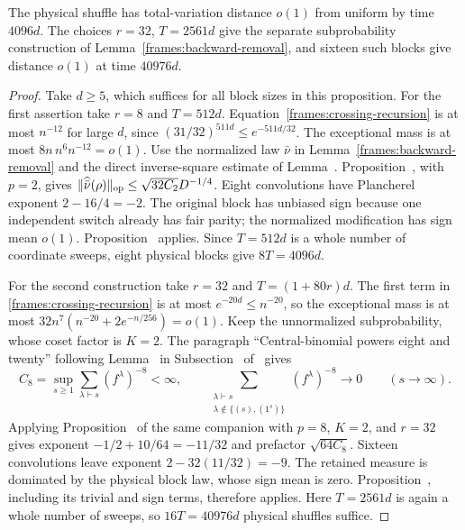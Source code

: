\begin{proposition}
\label{frames:pointwise-applications}
The physical shuffle has total-variation distance $o(1)$ from uniform
by time $4096d$. The choices $r=32$, $T=2561d$ give the separate
subprobability construction of Lemma~\ref{frames:backward-removal}, and
sixteen such blocks give distance $o(1)$ at time $40976d$.
\end{proposition}

\begin{proof}
Take $d\ge5$, which suffices for all block sizes in this proposition.
For the first assertion take $r=8$ and $T=512d$.
Equation~\eqref{frames:crossing-recursion} is at most $n^{-12}$ for
large $d$, since $(31/32)^{511d}\le e^{-511d/32}$.
The exceptional mass is at most $8n\,n^6n^{-12}=o(1)$.
Use the normalized law $\bar\nu$ in Lemma~\ref{frames:backward-removal} and the
direct inverse-square estimate of Lemma~.
Proposition~, with $p=2$, gives
$\|\widehat{\bar\nu}(\rho)\|_{\rm op}\le\sqrt{32C_2}D^{-1/4}$.
Eight convolutions have Plancherel exponent $2-16/4=-2$.
The original block has unbiased sign because one independent switch
already has fair parity; the normalized modification has sign mean
$o(1)$. Proposition~ applies. Since $T=512d$
is a whole number of coordinate sweeps, eight physical blocks give
$8T=4096d$.

For the second construction take $r=32$ and $T=(1+80r)d$.
The first term in \eqref{frames:crossing-recursion} is at most
$e^{-20d}\le n^{-20}$, so the exceptional mass is at most
$32n^7(n^{-20}+2e^{-n/256})=o(1)$.
Keep the unnormalized subprobability, whose coset factor is $K=2$.
The paragraph ``Central-binomial powers eight and twenty'' following
Lemma~ in
Subsection~ of~\cite{partial-fourier} gives
\[
 C_8=\sup_{s\ge1}\sum_{\lambda\vdash s}(f^\lambda)^{-8}<\infty,
 \qquad
 \sum_{\substack{\lambda\vdash s\\
                 \lambda\notin\{(s),(1^s)\}}}(f^\lambda)^{-8}
 \longrightarrow0\qquad(s\longrightarrow\infty).
\]
Applying Proposition~ of the same companion
with $p=8$, $K=2$, and $r=32$ gives exponent
$-1/2+10/64=-11/32$ and prefactor $\sqrt{64C_8}$.
Sixteen convolutions leave exponent $2-32(11/32)=-9$. The retained
measure is dominated by the physical block law, whose sign mean is zero.
Proposition~, including its trivial and sign terms,
therefore applies. Here $T=2561d$ is again a whole number of sweeps, so
$16T=40976d$ physical shuffles suffice.
\end{proof}

